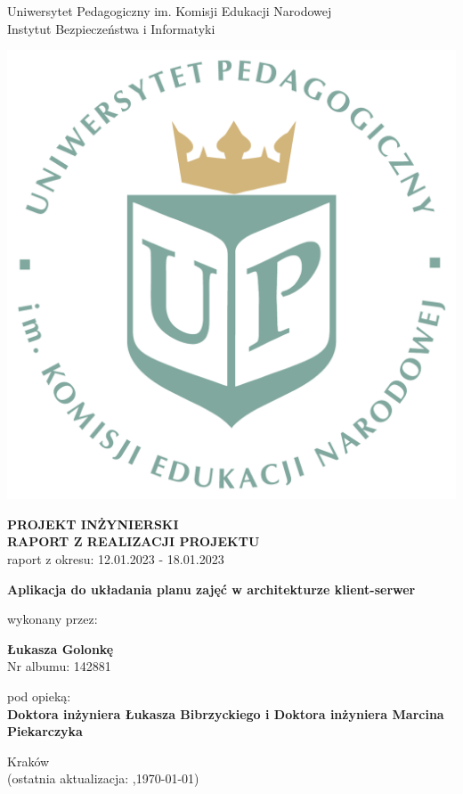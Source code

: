 \documentclass[12pt,a4paper,oneside]{article}
\theoremstyle{definition}
\numberwithin{equation}{section}
\begin{document}

\thispagestyle{empty}
\begin{titlepage}
\begin{center}\Large
Uniwersytet Pedagogiczny im. Komisji Edukacji Narodowej \\
\large
Instytut Bezpieczeństwa i Informatyki\\
\vskip 10pt
\end{center}
\begin{center}
\centering \includegraphics[width=0.4\columnwidth]{../resources/images/logoUP_pl.pdf}
\end{center}

\begin{center}
 {\bf \fontsize{14pt}{14pt}\selectfont PROJEKT INŻYNIERSKI \\ RAPORT Z REALIZACJI PROJEKTU\\
 }
 {\fontsize{12pt}{12pt} raport z okresu: 12.01.2023 - 18.01.2023}
\end{center}
\vskip 5pt
\begin{center}
 {\bf \fontsize{22pt}{22pt}\selectfont Aplikacja do układania planu zajęć w architekturze klient-serwer}
\end{center}

\begin{center}
 {\fontsize{12pt}{12pt}\selectfont wykonany przez: }
\end{center}
\begin{center}
 {\bf\fontsize{16pt}{16pt}\selectfont Łukasza Golonkę}\\
 {\fontsize{12pt}{12pt}\selectfont Nr albumu: 142881 \\}
\end{center}
\begin{center}
 {\fontsize{12pt}{12pt}\selectfont pod opieką:}\\
 {\bf\fontsize{12pt}{12pt}\selectfont Doktora inżyniera Łukasza Bibrzyckiego i Doktora inżyniera Marcina Piekarczyka}
\end{center}

\vspace*{\fill}
\begin{center}
\large
Kraków \the\year\\
(ostatnia aktualizacja: \DTMcurrenttime,\;\today)
\end{center}
\end{titlepage}
\setcounter{page}{0} 
\newpage\null\thispagestyle{empty}
\end{document}
